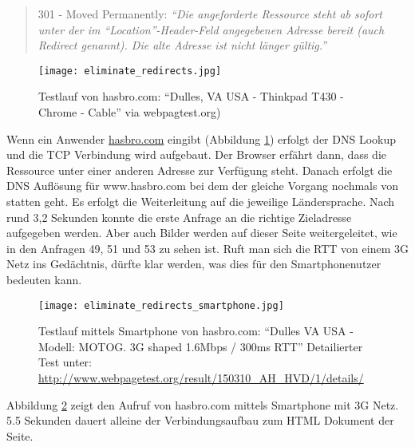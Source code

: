 \begin{itemize}
			\begin{quote}
				301 - Moved Permanently: \textit{"`Die angeforderte Ressource steht ab sofort unter der im "`Location"'-Header-Feld angegebenen Adresse bereit (auch Redirect genannt). Die alte Adresse ist nicht länger gültig."'} \autocite{wikipediaHTTP}
			\end{quote}

			\begin{figure}[htbp]
				\begin{center}
					\texttt{[image: eliminate\_redirects.jpg]}
					\caption{Testlauf von hasbro.com: "`Dulles, VA USA - Thinkpad T430 - Chrome - Cable"' via webpagtest.org)}
					\label{fig:eliminate_redirects}
				\end{center}
			\end{figure}
			
			Wenn ein Anwender \url{hasbro.com} eingibt (Abbildung \ref{fig:eliminate_redirects}) erfolgt der DNS Lookup und die TCP Verbindung wird aufgebaut. Der Browser erfährt dann, dass die Ressource unter einer anderen Adresse zur Verfügung steht. Danach erfolgt die DNS Auflösung für www.hasbro.com bei dem der gleiche Vorgang nochmals von statten geht. Es erfolgt die Weiterleitung auf die jeweilige Ländersprache. Nach rund 3,2 Sekunden konnte die erste Anfrage an die richtige Zieladresse aufgegeben werden. Aber auch Bilder werden auf dieser Seite weitergeleitet, wie in den Anfragen 49, 51 und 53 zu sehen ist. Ruft man sich die RTT von einem 3G Netz ins Gedächtnis, dürfte klar werden, was dies für den Smartphonenutzer bedeuten kann. \\

			\begin{figure}[htbp]
				\begin{center}
					\texttt{[image: eliminate\_redirects\_smartphone.jpg]}
					\caption{Testlauf mittels Smartphone von hasbro.com: "`Dulles VA USA - Modell: MOTOG. 3G shaped 1.6Mbps / 300ms RTT"' Detailierter Test unter: \url{http://www.webpagetest.org/result/150310_AH_HVD/1/details/}}
					\label{fig:eliminate_redirects_smartphone}
				\end{center}
			\end{figure}

			Abbildung \ref{fig:eliminate_redirects_smartphone} zeigt den Aufruf von hasbro.com mittels Smartphone mit 3G Netz. 5.5 Sekunden dauert alleine der Verbindungsaufbau zum HTML Dokument der Seite.\\


\end{itemize}
